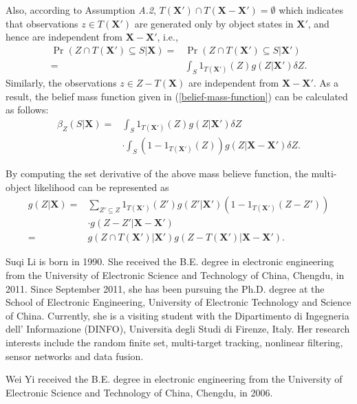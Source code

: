 \documentclass[journal]{IEEEtran}
\newcommand{\bX}{{\mathbf X}}
\begin{document}
{Also, according to Assumption \textit{A.2}, $T(\bX')\cap T(\bX-\bX')=\emptyset$  which indicates that  observations $z\in T(\bX')$ are generated only by object states in $\bX'$, and hence are independent from $\bX-\bX'$, i.e.,
\begin{equation}\label{belief-mass-function-subset-1}
\begin{split}
\Pr(Z\cap T(\bX')\subseteq S|\bX)
=&\Pr(Z\cap T(\bX')\subseteq S|\bX')\\
=&\int_{S} 1_{T(\bX')}(Z)g(Z|\bX') \delta Z.
\end{split}
\end{equation}
Similarly, the observations $z\in Z-T(\bX)$ are independent from $\bX-\bX'$. 
As a result, the belief mass function given in (\ref{belief-mass-function}) can be calculated  as follows:
\begin{equation}
\begin{split}
\beta_{Z}(S|\bX)=&
\int_{S} 1_{T(\bX')}(Z)g(Z|\bX') \delta Z  \\&\cdot \int_{S} (1-1_{T(\bX')}(Z))g(Z|\bX-\bX') \delta Z.
\end{split}
\end{equation}

By computing the set derivative of the above mass believe function, the multi-object likelihood can be represented as 
\begin{equation}
\begin{split}
g(Z|\bX)
=&\!\!\sum_{Z'\subseteq Z}1_{T(\bX')}(Z')g(Z'|\bX')(1-1_{T(\bX')}(Z\!-\!Z'))\\
&\cdot g(Z\!-\!Z'|\bX\!-\!\bX')\\
=&g(Z\cap T(\bX')|\bX')g(Z-T(\bX')|\bX-\bX').
\end{split}
\end{equation}





\begin{IEEEbiography}
{Suqi Li}  is born in 1990.  She received the B.E. degree in electronic engineering from the University of Electronic Science and Technology of China, Chengdu, in 2011. 
Since September 2011, she has been pursuing the Ph.D. degree at the School of Electronic Engineering, University of Electronic Technology and Science of China.  
Currently, she is a visiting student with the Dipartimento di Ingegneria dell' Informazione (DINFO), Universit$\grave{\mbox{a}}$ degli Studi di Firenze, Italy. Her research interests include the random finite set, multi-target tracking, nonlinear filtering, sensor networks and data fusion. 
\end{IEEEbiography}
 \begin{IEEEbiography}
{Wei Yi}
 received the B.E. degree in electronic engineering from the University of Electronic Science and Technology of China, Chengdu, in 2006.


\end{IEEEbiography}}
\end{document}
